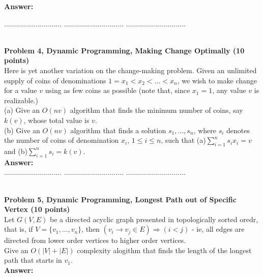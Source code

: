 \documentclass{article}
\begin{document}
\noindent
{\bf Answer:}

\pagebreak
{} $.............................$
 $..............................$
          $..............................$

\noindent
{}\\

\noindent
{\bf Problem 4, Dynamic Programming, Making Change Optimally (10 points)}\\
Here is yet another variation on the change-making problem.
Given an unlimited supply of coins of denominations $1=x_1 < x_2 < \ldots < x_n$, we wish to make change for
a value $ v$ using as few coins as possible (note that, since $x_1=1$, any value $v$ is realizable.) \\
(a) Give an $O(nv)$ algorithm that finds the minimum number of coins, say $k(v)$, whose total value is $v$.\\
(b) Give an $O(nv)$ algorithm that finds a solution $s_1, \ldots , s_n$, where $s_i$ denotes the number of coins
of denomination $x_i$, $1 \leq i \leq n$, such that (a)$\sum_{i=1}^n s_i x_i = v$ and 
(b)$\sum_{i=1}^n s_i  = k(v)$.\\

\noindent
{\bf Answer:}\\

\pagebreak
{} $.............................$
 $..............................$
          $..............................$

\noindent
{}\\

\noindent
{\bf Problem 5, Dynamic Programming, Longest Path out of Specific Vertex (10 points)}\\
Let $G(V,E)$ be a directed acyclic graph presented in topologically sorted oredr, that is, 
if $V=\{ v_1 , \ldots , v_n \}$, then $(v_i \rightarrow v_j \in E) \Rightarrow ( i < j )$ -
ie, all edges are directed from lower order vertices to higher order vertices.\\
Give an $O(|V|+|E|)$ complexity alogithm that finds the length of the longest path that starts in $v_1$.\\


\noindent
{\bf Answer:}
\end{document}
